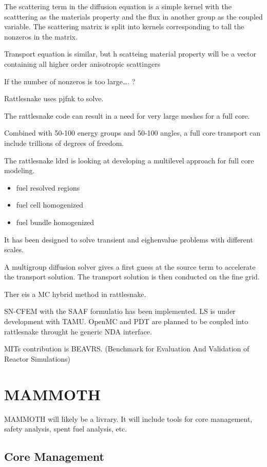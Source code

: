 The scattering term in the diffusion equation is a simple kernel with the 
scatttering as the materials property and the flux in another group as the 
coupled variable. 
The scattering matrix is split into kernels corresponding to tall the nonzeros 
in the matrix. 

Transport equation is similar, but h scatteing material property will be a 
vector containing all higher order anisotropic scattingers

If the number of nonzeros is too large\ldots. ?

Rattlesnake uses pjfnk to solve. 


The rattlesnake code can result in a need for very large meshes for a full core. 

Combined with 50-100 energy groups and 50-100 angles, a full core transport can 
include trillions of degrees of freedom.

The rattlesnake ldrd is looking at developing a multilevel approach for full 
core modeling. 
\begin{itemize}
  \item fuel resolved regions
  \item fuel cell homogenized
  \item fuel bundle homogenized
\end{itemize}

It has been designed to solve transient and eighenvalue problems with different 
scales. 

A multigroup diffusion solver gives a first guess at the source term to 
accelerate the transport solution. The transport solution is then conducted on 
the fine grid.

Ther eis a MC hybrid method in rattlesnake.

SN-CFEM with the SAAF formulatio has been implemented. LS is under development 
with TAMU. OpenMC and PDT are planned to be coupled into rattlesnake throught he 
generic NDA interface. 


MITs contribution is BEAVRS. (Benchmark for Evaluation And Validation of Reactor 
Simulations)



\section{MAMMOTH}
MAMMOTH will likely be a livrary. It will include tools for core management, 
safety analysis, spent fuel analysis, etc. 


\subsection{Core Management}

